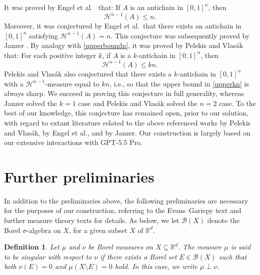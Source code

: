 \documentclass{publicadapt}
\newtheorem{definition}{Definition}
\begin{document}
 It was proved by Engel et al.\ \cite{EngelMitsisPelekisReiher2020} that: If $A$ is an antichain in $[0, 1]^{n}$, then
\begin{equation}\label{upperboundn}
 \mathcal{H}^{n-1}(A) \leq n. 
\end{equation}
 Moreover, it was conjectured by Engel et al.\ that there exists an antichain in $[0, 1]^{n}$ satisfying $\mathcal{H}^{n-1}(A) = n$. This conjecture was subsequently proved by Janzer 
 \cite{Janzer2020}. By analogy with \eqref{upperboundn}, it was proved by Pelekis and Vlas\'{a}k \cite{PelekisVlasak2020} that: For each positive integer $k$, if $A$ is a $k$-antichain 
 in $[0, 1]^{n}$, then
\begin{equation}\label{upperkn} 
 \mathcal{H}^{n-1}(A) \leq k n. 
\end{equation}
 Pelekis and Vlas\'{a}k also conjectured that there exists a $k$-antichain in $[0, 1]^{n}$ with a $\mathcal{H}^{n-1}$-measure equal to $kn$, i.e., so that the upper bound in 	 
 \eqref{upperkn} is always sharp. We succeed in proving this conjecture in full generality, whereas Janzer solved the $k = 1$ case and Pelekis and Vlas\'{a}k solved the $n = 2$ case. To the 
 best of our knowledge, this conjecture has remained open, prior to our solution, with regard to extant literature related to 
 the above referenced works by Pelekis and Vlas\'{a}k, by Engel et al., and by Janzer. 
 Our construction is largely based on our extensive interactions with GPT-5.5 Pro. 

\section{Further preliminaries}
 In addition to the preliminaries above, the following preliminaries are necessary for the purposes of our construction, referring to the Evans--Gariepy text 
 \cite{EvansGariepy2015} and further measure theory texts for details. As below, we let $\mathcal B(X)$ 
 denote the 
 Borel $\sigma$-algebra on $X$, for a given subset $X$ of $\mathbb{R}^{d}$. 
 
\begin{definition}\label{formalsingular}
 Let \(\mu\) and \(\nu\) be Borel measures on \(X\subseteq\mathbb R^d\). The measure
 \(\mu\) is said to be \emph{singular} with respect to \(\nu\) 
 if there exists a Borel set \(E\in\mathcal B(X)\) such that
 both $\nu(E)=0$ and 
 $\mu(X\setminus E)=0$ hold. 
 In this case, we write $
\mu\perp\nu$. 
 \end{definition}
\end{document}
